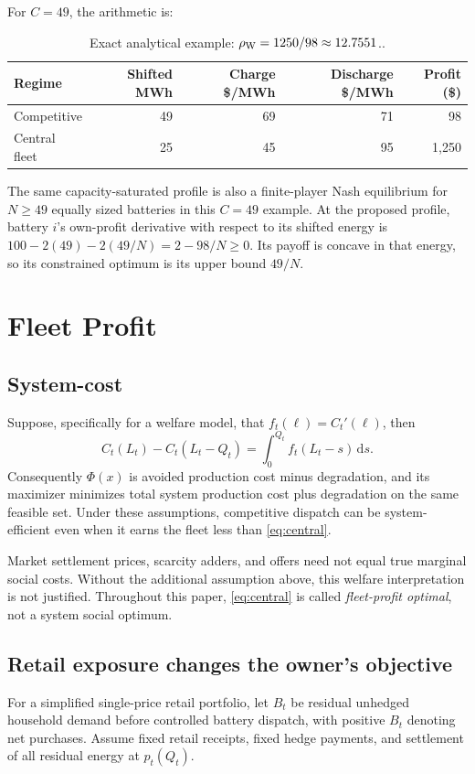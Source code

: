 \documentclass[11pt]{article}
\theoremstyle{remark}
\newcommand{\dd}{\mathrm d}
\begin{document}
For $C=49$, the arithmetic is:
\begin{table}[htbp]
\centering\small
\begin{tabular}{@{}lrrrr@{}}
\toprule
Regime & Shifted MWh & Charge \$/MWh & Discharge \$/MWh & Profit (\$)\\
\midrule
Competitive & 49 & 69 & 71 & 98\\
Central fleet & 25 & 45 & 95 & 1,250\\
\bottomrule
\end{tabular}
\caption{Exact analytical example: $\rho_{\rm W}=1250/98\approx12.7551$..}
\end{table}

The same capacity-saturated profile is also a finite-player Nash equilibrium
for $N\ge49$ equally sized batteries in this $C=49$ example. At the proposed
profile, battery $i$'s own-profit derivative with respect to its shifted
energy is $100-2(49)-2(49/N)=2-98/N\ge0$. Its payoff is concave in that
energy, so its constrained optimum is its upper bound $49/N$.


\section{Fleet Profit}
\label{sec:welfare}

\subsection{System-cost}
Suppose, specifically for a welfare model, that $f_t(\ell)=C_t'(\ell)$, then
\begin{equation}
 C_t(L_t)-C_t(L_t-Q_t)=\int_0^{Q_t}f_t(L_t-s)\,\dd s.
 \label{eq:welfare}
\end{equation}
Consequently $\Phi(x)$ is avoided production cost minus degradation, and
its maximizer minimizes total system production cost plus degradation on
the same feasible set. Under these assumptions, competitive dispatch can be
system-efficient even when it earns the fleet less than \eqref{eq:central}.

Market settlement prices, scarcity adders, and offers need not equal true
marginal social costs. Without the additional assumption above, this welfare
interpretation is not justified. Throughout this paper, \eqref{eq:central}
is called \emph{fleet-profit optimal}, not a system social optimum. 

\subsection{Retail exposure changes the owner's objective}
For a simplified single-price retail portfolio, let $B_t$ be residual
unhedged household demand before controlled battery dispatch, with positive
$B_t$ denoting net purchases. Assume fixed retail receipts, fixed hedge
payments, and settlement of all residual energy at $p_t(Q_t)$.
\end{document}
